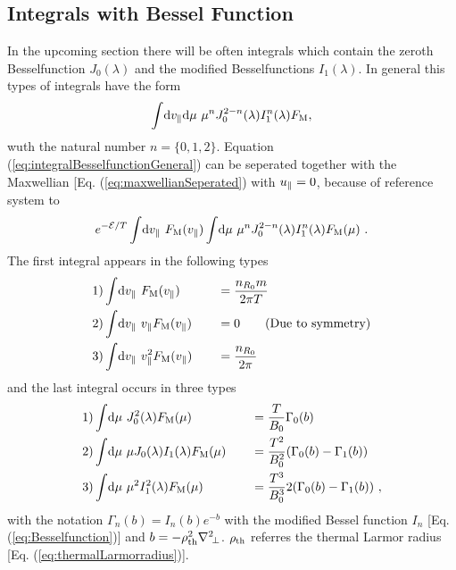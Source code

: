 \subsection*{Integrals with Bessel Function}
\label{sub:integralBesselfunction}

In the upcoming section there will be often integrals which contain the zeroth Besselfunction $J_0(\lambda)$ and the modified Besselfunctions $I_1(\lambda)$. In general this types of integrals have the form
\begin{gather}
	\int \! \mathrm{d}v_\parallel\mathrm{d}\mu~ \mu^n J_0^{2-n}(\lambda) I_1^n(\lambda) F_\mathrm{M} ,
	\label{eq:integralBesselfunctionGeneral}
\end{gather}
wuth the natural number $n = \{0, 1, 2\}$. Equation (\ref{eq:integralBesselfunctionGeneral}) can be seperated together with the Maxwellian [Eq. (\ref{eq:maxwellianSeperated}) with $u_\parallel = 0$, because of reference system to
\begin{gather}
	e^{-\mathcal{E}/T} \int \! \mathrm{d}v_\parallel ~ F_\mathrm{M}(v_\parallel) \int \! \mathrm{d}\mu ~ \mu^n J_0^{2-n}(\lambda) I_1^n(\lambda) F_\mathrm{M}(\mu) ~.
	\label{eq:integralBesselfunctionGeneralSperated}
\end{gather}
The first integral appears in the following types
\begin{gather}
	\begin{aligned}
		1)& \int \! \mathrm{d}v_\parallel ~         F_\mathrm{M}(v_\parallel) &\quad &= \frac{n_{R_0} m}{2\pi T} \\
		2)& \int \! \mathrm{d}v_\parallel ~ v_\parallel   F_\mathrm{M}(v_\parallel) &\quad &= 0 \qquad \mathrm{(Due~to~symmetry)}\\
		3)& \int \! \mathrm{d}v_\parallel ~ v_\parallel^2 F_\mathrm{M}(v_\parallel) &\quad &= \frac{n_{R_0}}{2\pi} \\
	\end{aligned}
	\label{eq:integralMaxwellian}
\end{gather}
and the last integral occurs in three types
\begin{gather}
	\begin{aligned}
		1)& \int \! \mathrm{d}\mu ~ J_0^2(\lambda) F_\mathrm{M}(\mu) &\quad &= \frac{T}{B_0} \Gamma_0(b) \\
		2)& \int \! \mathrm{d}\mu ~ \mu J_0(\lambda) I_1(\lambda) F_\mathrm{M}(\mu) &\quad &= \frac{T^2}{B_0^2} (\Gamma_0(b) - \Gamma_1(b)) \\
		3)& \int \! \mathrm{d}\mu ~ \mu^2 I_1^2(\lambda) F_\mathrm{M}(\mu) &\quad &= \frac{T^3}{B_0^3} 2 (\Gamma_0(b) - \Gamma_1(b))~, \\
	\end{aligned}
	\label{eq:integralBesselfunction}
\end{gather}
with the notation $\Gamma_n(b) = I_n(b) e^{-b}$ with the modified Bessel function $I_n$ [Eq. (\ref{eq:Besselfunction})] and $b= - \rho_{\mathrm{th}}^2 \nabla^2\!_\perp$. $\rho_{\mathrm{th}}$ referres the thermal Larmor radius [Eq. (\ref{eq:thermalLarmorradius})]. \cite{GKWDerivation}
\newpage